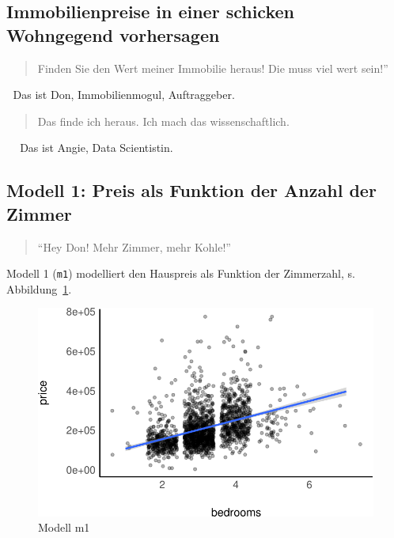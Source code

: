 \documentclass[
  a4paper,
  DIV=11]{scrreprt}
\theoremstyle{definition}
\theoremstyle{remark}
\begin{document}
\hypertarget{immobilienpreise-in-einer-schicken-wohngegend-vorhersagen}{%
\subsection{Immobilienpreise in einer schicken Wohngegend
vorhersagen}\label{immobilienpreise-in-einer-schicken-wohngegend-vorhersagen}}

\begin{quote}
Finden Sie den Wert meiner Immobilie heraus! Die muss viel wert sein!''
\end{quote}

🧑 Das ist Don, Immobilienmogul, Auftraggeber.

\begin{quote}
Das finde ich heraus. Ich mach das wissenschaftlich.
\end{quote}

👩 🔬 Das ist Angie, Data Scientistin.

\hypertarget{modell-1-preis-als-funktion-der-anzahl-der-zimmer}{%
\subsection{Modell 1: Preis als Funktion der Anzahl der
Zimmer}\label{modell-1-preis-als-funktion-der-anzahl-der-zimmer}}

\begin{quote}
``Hey Don! Mehr Zimmer, mehr Kohle!'' 👩 🔬
\end{quote}

Modell 1 (\texttt{m1}) modelliert den Hauspreis als Funktion der
Zimmerzahl, s. Abbildung~\ref{fig-m1}.

\begin{figure}

{\centering \includegraphics{./kausal_files/figure-pdf/fig-m1-1.pdf}

}

\caption{\label{fig-m1}Modell m1}

\end{figure}
\end{document}
